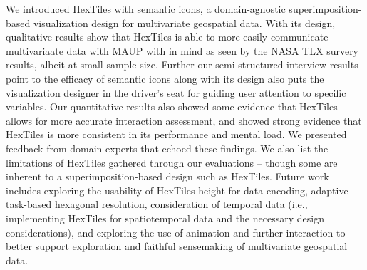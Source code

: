 We introduced HexTiles with semantic icons, a domain-agnostic superimposition-based visualization design for multivariate geospatial data.
%
With its design, qualitative results show that HexTiles is able to more easily communicate multivariaate data with MAUP with in mind as seen by the NASA TLX survery results, albeit at small sample size.
%
Further our semi-structured interview results point to the efficacy of semantic icons along with its design also puts the visualization designer in the driver's seat for guiding user attention to specific variables.
%
Our quantitative results also showed some evidence that HexTiles allows for more accurate interaction assessment, and showed strong evidence that HexTiles is more consistent in its performance and mental load. 
%
We presented feedback from domain experts that echoed these findings.
%
We also list the limitations of HexTiles gathered through our evaluations -- though some are inherent to a superimposition-based design such as HexTiles.
%
Future work includes exploring the usability of HexTiles height for data encoding, adaptive task-based hexagonal resolution, consideration of temporal data (i.e., implementing HexTiles for spatiotemporal data and the necessary design considerations), and exploring the use of animation and further interaction to better support exploration and faithful sensemaking of multivariate geospatial data.
